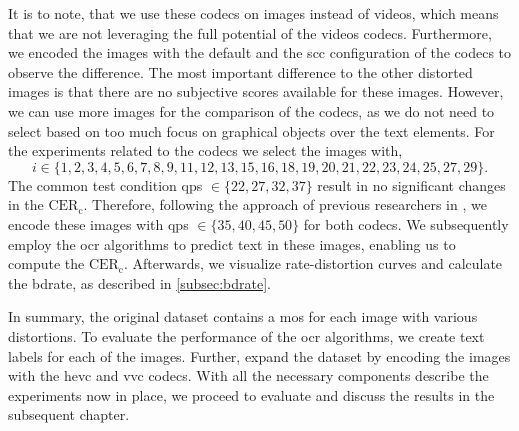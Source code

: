 It is to note, that we use these codecs on images instead of videos, which means that we are not leveraging the full potential of the videos codecs.
Furthermore, we encoded the images with the default and the \gls{scc} configuration of the codecs to observe the difference.
The most important difference to the other distorted images is that there are no subjective scores available for these images.
However, we can use more images for the comparison of the codecs, as we do not need to select based on too much focus on graphical objects over the text elements.
For the experiments related to the codecs we select the images with,
\begin{equation}
    i \in \{1, 2, 3, 4, 5, 6, 7, 8, 9, 11, 12, 13, 15, 16, 18, 19, 20, 21, 22, 23, 24, 25, 27, 29\}.
\end{equation}
The common test condition \glspl{qp} $\in \{22, 27, 32, 37\}$ result in no significant changes in the $\text{CER}_{\text{c}}$.
Therefore, following the approach of previous researchers in \cite{ultra_low_bitrate_2022}, we encode these images with \glspl{qp} $\in \{35, 40, 45, 50\}$ for both codecs.
We subsequently employ the \gls{ocr} algorithms to predict text in these images, enabling us to compute the $\text{CER}_{\text{c}}$.
Afterwards, we visualize rate-distortion curves and calculate the \gls{bdrate}, as described in \autoref{subsec:bdrate}.

In summary, the original dataset contains a \gls{mos} for each image with various distortions.
To evaluate the performance of the \gls{ocr} algorithms, we create text labels for each of the images.
Further, expand the dataset by encoding the images with the \gls{hevc} and \gls{vvc} codecs.
With all the necessary components describe the experiments now in place, we proceed to evaluate and discuss the results in the subsequent chapter.
